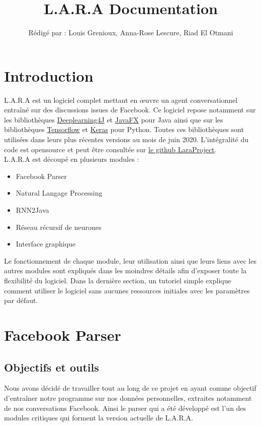 \documentclass[10pt,a4paper]{article}
\title{L.A.R.A Documentation}
\author{Rédigé par : Louis Grenioux, Anna-Rose Lescure, Riad El Otmani}
\newcommand\tab[1][0.5cm]{\hspace*{#1}}
\begin{document}
\maketitle
\tableofcontents
\newpage

\section{Introduction}
L.A.R.A est un logiciel complet mettant en œuvre un agent conversationnel entraîné sur des discussions issues de Facebook. Ce logiciel repose notamment sur les bibliothèques \href{https://deeplearning4j.org/}{Deeplearning4J} et \href{https://openjfx.io/}{JavaFX} pour Java ainsi que sur les bibliothèques \href{https://www.tensorflow.org/}{Tensorflow} et \href{https://keras.io/}{Keras} pour Python. Toutes ces bibliothèques sont utilisées dans leurs plus récentes versions au mois de juin 2020. L'intégralité du code est opensource et peut être consultée sur \href{https://github.com/LaraProject}{le github LaraProject}. \\
\tab L.A.R.A est découpé en plusieurs modules :
\begin{itemize}
\item Facebook Parser
\item Natural Langage Processing
\item RNN2Java
\item Réseau récursif de neurones
\item Interface graphique
\end{itemize}
Le fonctionnement de chaque module, leur utilisation ainsi que leurs liens avec les autres modules sont expliqués dans les moindres détails afin d'exposer toute la flexibilité du logiciel. Dans la dernière section, un tutoriel simple explique comment utiliser le logiciel sans aucunes ressources initiales avec les paramètres par défaut.
 
\section{Facebook Parser}
\subsection{Objectifs et outils}
Nous avons décidé de travailler tout au long de ce projet en ayant comme objectif d'entraîner notre programme sur nos données personnelles, extraites notamment de nos conversations Facebook. Ainsi le parser qui a été développé est l'un des modules critiques qui forment la version actuelle de L.A.R.A.
\end{document}
